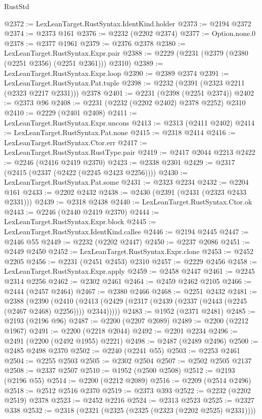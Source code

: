 \begin{lexlean}{RustStd}
\begin{coremodule}
@2372 := LexLeanTarget.RustSyntax.IdentKind.holder
@2373 := @2194 @2372
@2374 := @2373 @161
@2376 := @2232 (@2202 @2374)
@2377 := Option.none.{0}
@2378 := @2377 @1961
@2379 := @2376 @2378
@2380 := LexLeanTarget.RustSyntax.Expr.pair
@2388 := @2229 (@2231 (@2379 (@2380 (@2251 @2356) (@2251 @2361))) @2310)
@2389 := LexLeanTarget.RustSyntax.Expr.loop
@2390 := @2389 @2374
@2391 := LexLeanTarget.RustSyntax.Pat.tuple
@2398 := @2232 (@2391 (@2323 @2211 (@2323 @2217 @2331))) @2378
@2401 := @2231 (@2398 (@2251 @2374))
@2402 := @2373 @96
@2408 := @2231 (@2232 (@2202 @2402) @2378 @2252) @2310
@2410 := @2229 (@2401 @2408)
@2411 := LexLeanTarget.RustSyntax.Expr.uncons
@2413 := @2313 (@2411 @2402)
@2414 := LexLeanTarget.RustSyntax.Pat.none
@2415 := @2318 @2414
@2416 := LexLeanTarget.RustSyntax.Ctor.err
@2417 := LexLeanTarget.RustSyntax.RustType.pair
@2419 := @2417 @2044 @2213
@2422 := @2246 (@2416 @2419 @2370)
@2423 := @2338 @2301
@2429 := @2317 (@2415 (@2337 (@2422 (@2245 @2423 @2256))))
@2430 := LexLeanTarget.RustSyntax.Pat.some
@2431 := @2323 @2234
@2432 := @2204 @161
@2433 := @2202 @2432
@2438 := @2430 (@2391 (@2431 (@2323 @2433 @2331)))
@2439 := @2318 @2438
@2440 := LexLeanTarget.RustSyntax.Ctor.ok
@2443 := @2246 (@2440 @2419 @2370)
@2444 := LexLeanTarget.RustSyntax.Expr.block
@2445 := LexLeanTarget.RustSyntax.IdentKind.callee
@2446 := @2194 @2445
@2447 := @2446 @55
@2449 := @2232 (@2202 @2447)
@2450 := @2237 @2086
@2451 := @2449 @2450
@2452 := LexLeanTarget.RustSyntax.Expr.clone
@2453 := @2452 @2205
@2456 := @2231 (@2451 @2453) @2310
@2457 := @2229 @2456
@2458 := LexLeanTarget.RustSyntax.Expr.apply
@2459 := @2458 @2447
@2461 := @2245 @2314 @2256
@2462 := @2302 @2461
@2464 := @2459 @2462 @2105
@2466 := @2444 (@2457 @2464)
@2467 := @2380 @2466
@2468 := @2251 @2432
@2481 := @2388
    (@2390
      (@2410 (@2413 (@2429 (@2317 (@2439 (@2337 (@2443 (@2245 (@2467 @2468) @2256)))) @2344)))))
@2483 := @1952 (@2371 @2481)
@2485 := @2193 (@2196 @96)
@2487 := @2200 (@2207 @2089)
@2489 := @2200 (@2212 @1967)
@2491 := @2200 (@2218 @2044)
@2492 := @2201 @2234
@2496 := @2491 (@2200 (@2492 @1955) @2221)
@2498 := @2487 (@2489 @2496)
@2500 := @2485 @2498 @2370
@2502 := @2240 (@2241 @55)
@2503 := @2253 @2461
@2504 := @2255 @2503
@2505 := @2302 @2504
@2507 := @2502 @2505 @2137
@2508 := @2337 @2507
@2510 := @1952 (@2500 @2508)
@2512 := @2193 (@2196 @55)
@2514 := @2200 (@2212 @2089)
@2516 := @2209 (@2514 @2496)
@2518 := @2512 @2516 @2370
@2519 := @2373 @393
@2522 := @2232 (@2202 @2519) @2378
@2523 := @2452 @2216
@2524 := @2313 @2523
@2525 := @2327 @338
@2532 := @2318 (@2321 (@2325 (@2325 (@2323 (@2202 @2525) @2331))))

\end{coremodule}
\end{lexlean}
